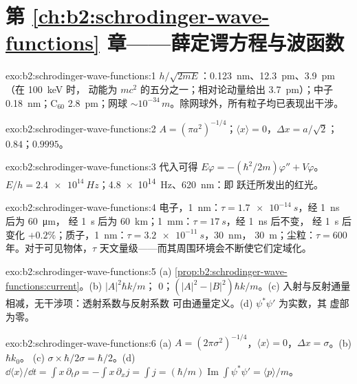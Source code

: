 \section*{第 \ref{ch:b2:schrodinger-wave-functions} 章——薛定谔方程与波函数}

\begin{solution}{exo:b2:schrodinger-wave-functions:1}
$h/\sqrt{2mE}$：\qty{0.123}{nm}、\qty{12.3}{pm}、\qty{3.9}{pm}（在 \qty{100}{keV} 时，
动能为 $mc^2$ 的五分之一；相对论动量给出
\qty{3.7}{pm}）；中子 \qty{0.18}{nm}；C$_{60}$ \qty{2.8}{pm}；网球
$\sim 10^{-34}\,\unit{m}$。除网球外，所有粒子均已表现出干涉。
\end{solution}

\begin{solution}{exo:b2:schrodinger-wave-functions:2}
$A = (\pi a^2)^{-1/4}$；$\langle x\rangle = 0$，$\Delta x = a/\sqrt2$；$0.84$；$0.9995$。
\end{solution}

\begin{solution}{exo:b2:schrodinger-wave-functions:3}
代入可得 $E\varphi = -(\hbar^2/2m)\varphi'' + V\varphi$。$E/h =
\qty{2.4e14}{Hz}$；\qty{4.8e14}{Hz}、\qty{620}{nm}：即
跃迁所发出的红光。
\end{solution}

\begin{solution}{exo:b2:schrodinger-wave-functions:4}
电子，\qty{1}{nm}：$\tau = \qty{1.7e-14}{s}$，经 \qty{1}{ns} 后为 \qty{60}{\micro m}，
经 \qty{1}{s} 后为 \qty{60}{km}；\qty{1}{mm}：$\tau = \qty{17}{s}$，经 \qty{1}{ns} 后不变，
经 \qty{1}{s} 后变化 $+0.2\%$；质子，\qty{1}{nm}：$\tau = \qty{3.2e-11}{s}$，\qty{30}{nm}，
\qty{30}{m}；尘粒：$\tau = 600$ 年。对于可见物体，$\tau$
天文量级——而其周围环境会不断使它们定域化。
\end{solution}

\begin{solution}{exo:b2:schrodinger-wave-functions:5}
(a) \cref{prop:b2:schrodinger-wave-functions:current}。(b) $|A|^2\hbar k/m$；
$0$；$(|A|^2 - |B|^2)\hbar k/m$。(c) 入射与反射通量
相减，无干涉项：透射系数与反射系数
可由通量定义。(d) $\psi^*\psi'$ 为实数，其
虚部为零。
\end{solution}

\begin{solution}{exo:b2:schrodinger-wave-functions:6}
(a) $A = (2\pi\sigma^2)^{-1/4}$，$\langle x\rangle = 0$，$\Delta x = \sigma$。(b) $\hbar k_0$。
(c) $\sigma \times \hbar/2\sigma = \hbar/2$。(d) $\dd\langle x\rangle/\dd t = \int x\,
\partial_t\rho = -\int x\,\partial_xj = \int j = (\hbar/m)\operatorname{Im}\int\psi^*
\psi' = \langle p\rangle/m$。
\end{solution}

